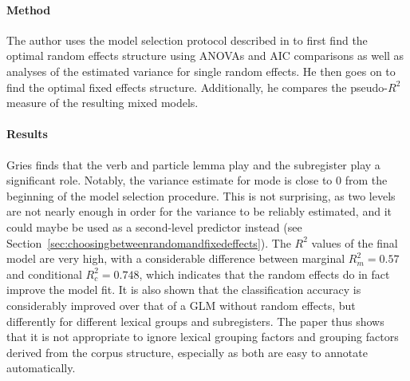 \begin{mdframed}
  \paragraph{Method}
  
  The author uses the model selection protocol described in \citet{ZuurEa2009} to first find the optimal random effects structure using ANOVAs and AIC comparisons as well as analyses of the estimated variance for single random effects.
  He then goes on to find the optimal fixed effects structure.
  Additionally, he compares the pseudo-$R^2$ measure of the resulting mixed models.
  
  \paragraph{Results}

  Gries finds that the verb and particle lemma play and the subregister play a significant role.
  Notably, the variance estimate for mode is close to $0$ from the beginning of the model selection procedure.
  This is not surprising, as two levels are not nearly enough in order for the variance to be reliably estimated, and it could maybe be used as a second-level predictor instead (see Section~\ref{sec:choosingbetweenrandomandfixedeffects}).
  The $R^2$ values of the final model are very high, with a considerable difference between marginal $R^2_m=0.57$ and conditional $R^2_c=0.748$, which indicates that the random effects do in fact improve the model fit.
  It is also shown that the classification accuracy is considerably improved over that of a GLM without random effects, but differently for different lexical groups and subregisters.
  The paper thus shows that it is not appropriate to ignore lexical grouping factors and grouping factors derived from the corpus structure, especially as both are easy to annotate automatically.

\end{mdframed}

